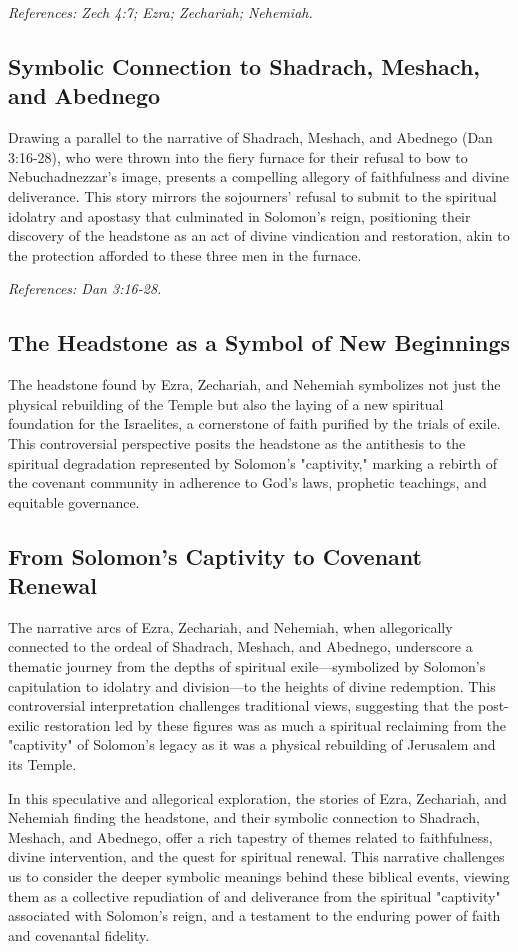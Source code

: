 \textit{References: Zech 4:7; Ezra; Zechariah; Nehemiah.}

\subsection{Symbolic Connection to Shadrach, Meshach, and Abednego}

Drawing a parallel to the narrative of Shadrach, Meshach, and Abednego (Dan 3:16-28), who were thrown into the fiery furnace for their refusal to bow to Nebuchadnezzar's image, presents a compelling allegory of faithfulness and divine deliverance. This story mirrors the sojourners' refusal to submit to the spiritual idolatry and apostasy that culminated in Solomon's reign, positioning their discovery of the headstone as an act of divine vindication and restoration, akin to the protection afforded to these three men in the furnace.

\textit{References: Dan 3:16-28.}

\subsection{The Headstone as a Symbol of New Beginnings}

The headstone found by Ezra, Zechariah, and Nehemiah symbolizes not just the physical rebuilding of the Temple but also the laying of a new spiritual foundation for the Israelites, a cornerstone of faith purified by the trials of exile. This controversial perspective posits the headstone as the antithesis to the spiritual degradation represented by Solomon's "captivity," marking a rebirth of the covenant community in adherence to God's laws, prophetic teachings, and equitable governance.

\subsection{From Solomon's Captivity to Covenant Renewal}

The narrative arcs of Ezra, Zechariah, and Nehemiah, when allegorically connected to the ordeal of Shadrach, Meshach, and Abednego, underscore a thematic journey from the depths of spiritual exile—symbolized by Solomon's capitulation to idolatry and division—to the heights of divine redemption. This controversial interpretation challenges traditional views, suggesting that the post-exilic restoration led by these figures was as much a spiritual reclaiming from the "captivity" of Solomon's legacy as it was a physical rebuilding of Jerusalem and its Temple.



In this speculative and allegorical exploration, the stories of Ezra, Zechariah, and Nehemiah finding the headstone, and their symbolic connection to Shadrach, Meshach, and Abednego, offer a rich tapestry of themes related to faithfulness, divine intervention, and the quest for spiritual renewal. This narrative challenges us to consider the deeper symbolic meanings behind these biblical events, viewing them as a collective repudiation of and deliverance from the spiritual "captivity" associated with Solomon's reign, and a testament to the enduring power of faith and covenantal fidelity.


